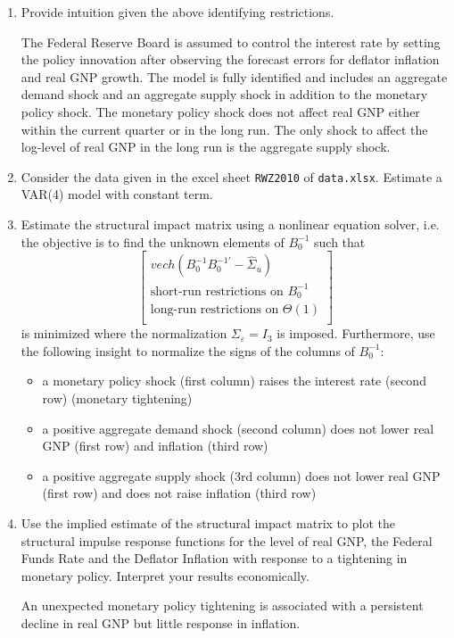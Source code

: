 \documentclass[a4paper]{scrartcl}
\begin{document}
\begin{enumerate}
	\item Provide intuition given the above identifying restrictions.
	\begin{solution}
		 The Federal Reserve Board is assumed to control the interest rate by setting the policy innovation after observing the forecast errors for deflator inflation and real GNP growth. The model is fully identified and includes an aggregate demand shock and an aggregate supply shock in addition to the monetary policy shock. The monetary policy shock does not affect real GNP either within the current quarter or in the long run. The only shock to affect the log-level of real GNP in the long run is the aggregate supply shock. 
	\end{solution}
	\item Consider the data given in the excel sheet \texttt{RWZ2010} of \texttt{data.xlsx}. Estimate a VAR(4) model with constant term.
	\item Estimate the structural impact matrix using a nonlinear equation solver, i.e. the objective is to find the unknown elements of $B_0^{-1}$ such that
	$$\begin{bmatrix}
	vech(B_0^{-1}B_0^{-1'}-\hat{\Sigma}_u)\\
	\text{short-run restrictions on }B_0^{-1}\\
		\text{long-run restrictions on }\Theta(1)\\
	\end{bmatrix}$$
is minimized where the normalization $\Sigma_\varepsilon=I_3$ is imposed. Furthermore, use the following insight to normalize the signs of the columns of $B_0^{-1}$:
\begin{itemize}
	\item a monetary policy shock (first column) raises the interest rate (second row) (monetary tightening)
	\item a positive aggregate demand shock (second column) does not lower real GNP (first row) and inflation (third row)
	\item a positive aggregate supply shock (3rd column) does not lower real GNP (first row) and does not raise inflation (third row)
\end{itemize}
\item Use the implied estimate of the structural impact matrix to plot the structural impulse response functions for the level of real GNP, the Federal Funds Rate and the Deflator Inflation with response to a tightening in monetary policy. Interpret your results economically.
\begin{solution}
	An unexpected monetary policy tightening is associated with a persistent decline in real GNP but little response in inflation.
\end{solution}
\end{enumerate}
\newpage
\end{document}
